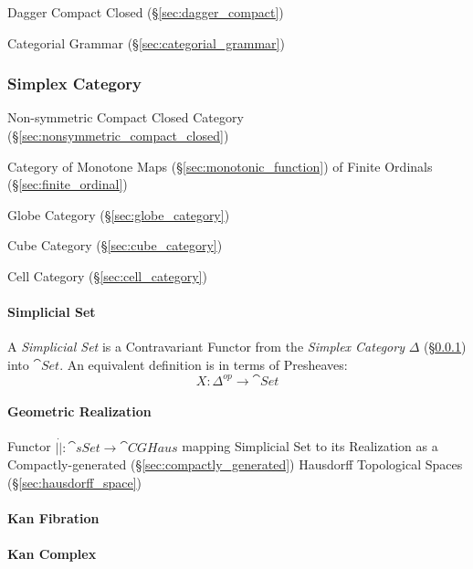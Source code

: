 Dagger Compact Closed (\S\ref{sec:dagger_compact})

Categorial Grammar (\S\ref{sec:categorial_grammar})



\subsubsection{Simplex Category}\label{sec:simplex_category}

Non-symmetric Compact Closed Category
(\S\ref{sec:nonsymmetric_compact_closed})

Category of Monotone Maps (\S\ref{sec:monotonic_function}) of Finite
Ordinals (\S\ref{sec:finite_ordinal})

\fist Globe Category (\S\ref{sec:globe_category})

\fist Cube Category (\S\ref{sec:cube_category})

\fist Cell Category (\S\ref{sec:cell_category})



\paragraph{Simplicial Set}\label{sec:simplicial_set}\hfill

A \emph{Simplicial Set} is a Contravariant Functor from the
\emph{Simplex Category} $\Delta$ (\S\ref{sec:simplex_category}) into
$\cat{Set}$. An equivalent definition is in terms of Presheaves:
\[
  X: \Delta^{op} \rightarrow \cat{Set}
\]



\paragraph{Geometric Realization}\label{sec:geometric_realization}\hfill

Functor $|\dot| : \cat{sSet} \rightarrow \cat{CGHaus}$ mapping
Simplicial Set to its Realization as a Compactly-generated
(\S\ref{sec:compactly_generated}) Hausdorff Topological Spaces
(\S\ref{sec:hausdorff_space})



\paragraph{Kan Fibration}\label{sec:kan_fibration}\hfill

\paragraph{Kan Complex}\label{sec:kan_complex}\hfill


